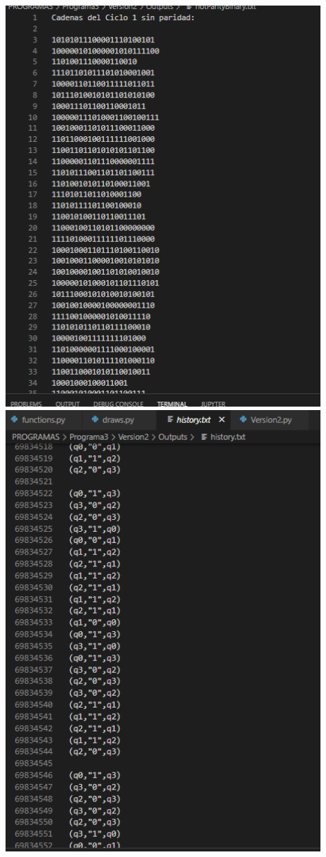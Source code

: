 \documentclass{article}
\begin{document}
\begin{center}
    \newline\newline
    \includegraphics[width = 12cm]{NotParidad.PNG}
    \newline\newline
    \includegraphics[width = 12cm]{history.PNG}

\end{center}
\end{document}
